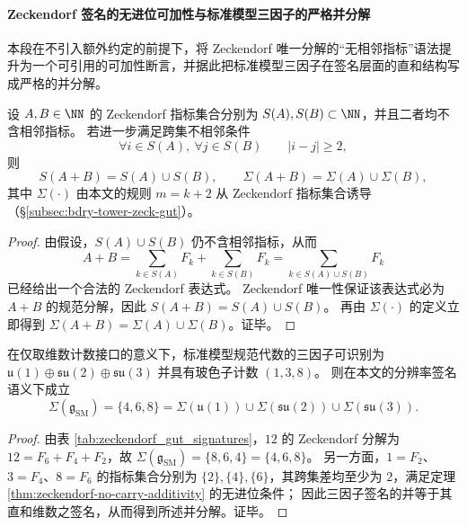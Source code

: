\paragraph{Zeckendorf 签名的无进位可加性与标准模型三因子的严格并分解}\label{par:zeckendorf-no-carry-additivity}
本段在不引入额外约定的前提下，将 Zeckendorf 唯一分解的“无相邻指标”语法提升为一个可引用的可加性断言，并据此把标准模型三因子在签名层面的直和结构写成严格的并分解。

\begin{theorem}\label{thm:zeckendorf-no-carry-additivity}
设 \(A,B\in\NN\) 的 Zeckendorf 指标集合分别为 \(S(A),S(B)\subset\NN\)，并且二者均不含相邻指标。
若进一步满足跨集不相邻条件
\[
\forall i\in S(A),\ \forall j\in S(B)\qquad |i-j|\ge 2,
\]
则
\[
S(A+B)=S(A)\cup S(B),
\qquad
\Sigma(A+B)=\Sigma(A)\cup\Sigma(B),
\]
其中 \(\Sigma(\cdot)\) 由本文的规则 \(m=k+2\) 从 Zeckendorf 指标集合诱导（\S\ref{subsec:bdry-tower-zeck-gut}）。
\end{theorem}
\begin{proof}
由假设，\(S(A)\cup S(B)\) 仍不含相邻指标，从而
\[
A+B=\sum_{k\in S(A)}F_k+\sum_{k\in S(B)}F_k=\sum_{k\in S(A)\cup S(B)}F_k
\]
已经给出一个合法的 Zeckendorf 表达式。
Zeckendorf 唯一性保证该表达式必为 \(A+B\) 的规范分解，因此 \(S(A+B)=S(A)\cup S(B)\)。
再由 \(\Sigma(\cdot)\) 的定义立即得到 \(\Sigma(A+B)=\Sigma(A)\cup\Sigma(B)\)。证毕。
\end{proof}

\begin{corollary}[标准模型三因子在签名层面的严格并分解]\label{cor:sm-signature-strict-union}
在仅取维数计数接口的意义下，标准模型规范代数的三因子可识别为
\(
\mathfrak u(1)\oplus\mathfrak{su}(2)\oplus\mathfrak{su}(3)
\)
并具有玻色子计数 \((1,3,8)\)。
则在本文的分辨率签名语义下成立
\[
\Sigma(\mathfrak g_{\mathrm{SM}})=\{4,6,8\}
=\Sigma(\mathfrak u(1))\cup\Sigma(\mathfrak{su}(2))\cup\Sigma(\mathfrak{su}(3)).
\]
\end{corollary}
\begin{proof}
由表 \ref{tab:zeckendorf_gut_signatures}，\(12\) 的 Zeckendorf 分解为 \(12=F_6+F_4+F_2\)，故 \(\Sigma(\mathfrak g_{\mathrm{SM}})=\{8,6,4\}=\{4,6,8\}\)。
另一方面，\(1=F_2\)、\(3=F_4\)、\(8=F_6\) 的指标集合分别为 \(\{2\},\{4\},\{6\}\)，其跨集差均至少为 \(2\)，满足定理 \ref{thm:zeckendorf-no-carry-additivity} 的无进位条件；
因此三因子签名的并等于其直和维数之签名，从而得到所述并分解。证毕。
\end{proof}
